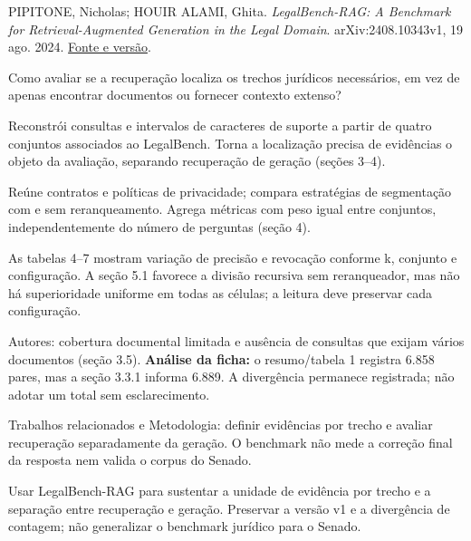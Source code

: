 {\small PIPITONE, Nicholas; HOUIR ALAMI, Ghita. \textit{LegalBench-RAG: A Benchmark for Retrieval-Augmented Generation in the Legal Domain}. arXiv:2408.10343v1, 19 ago. 2024. \href{https://arxiv.org/abs/2408.10343v1}{Fonte e versão}.\par}

Como avaliar se a recuperação localiza os trechos jurídicos necessários, em vez de apenas encontrar documentos ou fornecer contexto extenso?

Reconstrói consultas e intervalos de caracteres de suporte a partir de quatro conjuntos associados ao LegalBench. Torna a localização precisa de evidências o objeto da avaliação, separando recuperação de geração (seções 3--4).

Reúne contratos e políticas de privacidade; compara estratégias de segmentação com e sem reranqueamento. Agrega métricas com peso igual entre conjuntos, independentemente do número de perguntas (seção 4).

As tabelas 4--7 mostram variação de precisão e revocação conforme k, conjunto e configuração. A seção 5.1 favorece a divisão recursiva sem reranqueador, mas não há superioridade uniforme em todas as células; a leitura deve preservar cada configuração.

\begin{itemize}
\end{itemize}

Autores: cobertura documental limitada e ausência de consultas que exijam vários documentos (seção 3.5). \textbf{Análise da ficha:} o resumo/tabela 1 registra 6.858 pares, mas a seção 3.3.1 informa 6.889. A divergência permanece registrada; não adotar um total sem esclarecimento.

Trabalhos relacionados e Metodologia: definir evidências por trecho e avaliar recuperação separadamente da geração. O benchmark não mede a correção final da resposta nem valida o corpus do Senado.

Usar LegalBench-RAG para sustentar a unidade de evidência por trecho e a separação entre recuperação e geração. Preservar a versão v1 e a divergência de contagem; não generalizar o benchmark jurídico para o Senado.

